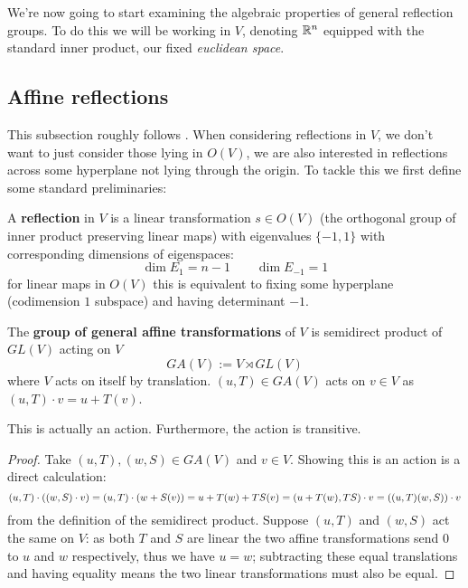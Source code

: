 \documentclass[../main.tex]{subfiles}
\begin{document}
We're now going to start examining the algebraic properties of general reflection groups. To do this we will be working in $V$, denoting $\mathbb{R}^n$ equipped with the standard inner product, our fixed \textit{euclidean space}.

\subsection{Affine reflections}\label{subsection:affine reflections}

This subsection roughly follows \cite{Berger2009}. When considering reflections in $V$, we don't want to just consider those lying in $O(V)$, we are also interested in reflections across some hyperplane not lying through the origin. To tackle this we first define some standard preliminaries:

\begin{definition}
    A \textbf{reflection} in $V$ is a linear transformation $s\in O(V)$ (the orthogonal group of inner product preserving linear maps) with eigenvalues $\{-1,1\}$ with corresponding dimensions of eigenspaces:\[
        \dim{E_1} = n-1 \qquad \dim{E_{-1}} = 1
    \]
    for linear maps in $O(V)$ this is equivalent to fixing some hyperplane (codimension $1$ subspace) and having determinant $-1$.
\end{definition}

\begin{definition}
    The \textbf{group of general affine transformations} of $V$ is semidirect product of $GL(V)$ acting on $V$\[
    GA(V) := V \rtimes GL(V)
    \] where $V$ acts on itself by translation. $(u,T)\in GA(V)$ acts on $v\in V$ as $(u,T)\cdot v = u + T(v)$.
\end{definition}

\begin{proposition}
    This is actually an action. Furthermore, the action is transitive.
    \begin{proof}
        Take $(u,T), (w,S)\in GA(V)$ and $v\in V$. Showing this is an action is a direct calculation: \[
        (u,T) \cdot \left( (w,S) \cdot v \right) = (u,T)\cdot \left( w + S(v) \right) = u + T(w) + TS(v) = (u+T(w),TS)\cdot v = \left( (u,T)(w,S) \right)\cdot v\]
        from the definition of the semidirect product. Suppose $(u,T)$ and $(w,S)$ act the same on $V$: as both $T$ and $S$ are linear the two affine transformations send $0$ to $u$ and $w$ respectively, thus we have $u=w$; subtracting these equal translations and having equality means the two linear transformations must also be equal.
    \end{proof}
\end{proposition}
\end{document}
